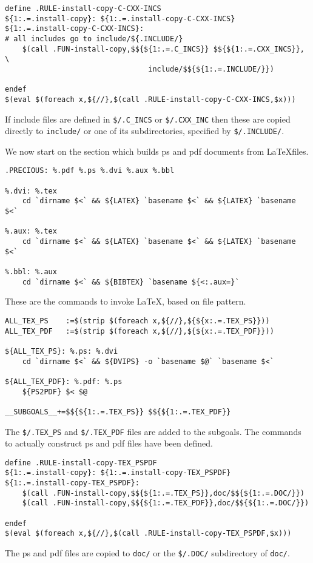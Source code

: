 \documentclass[letterpaper]{article}
\begin{document}
\begin{verbatim}
define .RULE-install-copy-C-CXX-INCS
${1:.=.install-copy}: ${1:.=.install-copy-C-CXX-INCS}
${1:.=.install-copy-C-CXX-INCS}:
# all includes go to include/${.INCLUDE/}
	$(call .FUN-install-copy,$${${1:.=.C_INCS}} $${${1:.=.CXX_INCS}}, \
                                 include/$${${1:.=.INCLUDE/}})

endef
$(eval $(foreach x,${//},$(call .RULE-install-copy-C-CXX-INCS,$x)))
\end{verbatim}
If include files are defined in \verb+$/.C_INCS+ or \verb+$/.CXX_INC+
then these are copied directly to \verb+include/+ or one of its
subdirectories, specified by \verb+$/.INCLUDE/+.

We now start on the section which builds ps and pdf documents from
\LaTeX files.
\begin{verbatim}
.PRECIOUS: %.pdf %.ps %.dvi %.aux %.bbl

%.dvi: %.tex
	cd `dirname $<` && ${LATEX} `basename $<` && ${LATEX} `basename $<`

%.aux: %.tex
	cd `dirname $<` && ${LATEX} `basename $<` && ${LATEX} `basename $<`

%.bbl: %.aux
	cd `dirname $<` && ${BIBTEX} `basename ${<:.aux=}`
\end{verbatim}
These are the commands to invoke \LaTeX, based on file pattern.

\begin{verbatim}
ALL_TEX_PS    :=$(strip $(foreach x,${//},${${x:.=.TEX_PS}}))
ALL_TEX_PDF   :=$(strip $(foreach x,${//},${${x:.=.TEX_PDF}}))

${ALL_TEX_PS}: %.ps: %.dvi
	cd `dirname $<` && ${DVIPS} -o `basename $@` `basename $<`

${ALL_TEX_PDF}: %.pdf: %.ps
	${PS2PDF} $< $@

__SUBGOALS__+=$${${1:.=.TEX_PS}} $${${1:.=.TEX_PDF}}
\end{verbatim}
The \verb+$/.TEX_PS+ and \verb+$/.TEX_PDF+ files are added to the
subgoals.  The commands to actually construct ps and pdf files 
have been defined.

\begin{verbatim}
define .RULE-install-copy-TEX_PSPDF
${1:.=.install-copy}: ${1:.=.install-copy-TEX_PSPDF}
${1:.=.install-copy-TEX_PSPDF}:
	$(call .FUN-install-copy,$${${1:.=.TEX_PS}},doc/$${${1:.=.DOC/}})
	$(call .FUN-install-copy,$${${1:.=.TEX_PDF}},doc/$${${1:.=.DOC/}})

endef
$(eval $(foreach x,${//},$(call .RULE-install-copy-TEX_PSPDF,$x)))
\end{verbatim}
The ps and pdf files are copied to \verb+doc/+ or the
\verb+$/.DOC/+ subdirectory of \verb+doc/+.
\end{document}
